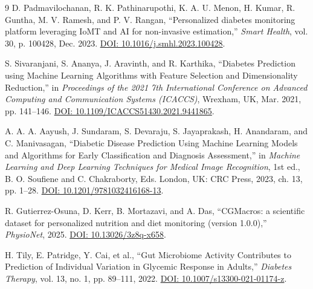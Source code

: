 \documentclass[12pt]{article}
\begin{document}
\begin{thebibliography}{9}
D. Padmavilochanan, R. K. Pathinarupothi, K. A. U. Menon, H. Kumar, R. Guntha, M. V. Ramesh, and P. V. Rangan, 
``Personalized diabetes monitoring platform leveraging IoMT and AI for non-invasive estimation,'' 
\emph{Smart Health}, vol. 30, p. 100428, Dec. 2023. 
\href{https://doi.org/10.1016/j.smhl.2023.100428}{DOI: 10.1016/j.smhl.2023.100428}.

S. Sivaranjani, S. Ananya, J. Aravinth, and R. Karthika, 
``Diabetes Prediction using Machine Learning Algorithms with Feature Selection and Dimensionality Reduction,'' 
in \emph{Proceedings of the 2021 7th International Conference on Advanced Computing and Communication Systems (ICACCS)}, Wrexham, UK, Mar. 2021, pp. 141--146. 
\href{https://doi.org/10.1109/ICACCS51430.2021.9441865}{DOI: 10.1109/ICACCS51430.2021.9441865}.

A. A. A. Aayush, J. Sundaram, S. Devaraju, S. Jayaprakash, H. Anandaram, and C. Manivasagan, 
``Diabetic Disease Prediction Using Machine Learning Models and Algorithms for Early Classification and Diagnosis Assessment,'' 
in \emph{Machine Learning and Deep Learning Techniques for Medical Image Recognition}, 1st ed., B. O. Soufiene and C. Chakraborty, Eds. London, UK: CRC Press, 2023, ch. 13, pp. 1--28. 
\href{https://doi.org/10.1201/9781032416168-13}{DOI: 10.1201/9781032416168-13}.

R. Gutierrez-Osuna, D. Kerr, B. Mortazavi, and A. Das, 
``CGMacros: a scientific dataset for personalized nutrition and diet monitoring (version 1.0.0),'' 
\emph{PhysioNet}, 2025. 
\href{https://doi.org/10.13026/3z8q-x658}{DOI: 10.13026/3z8q-x658}.

H. Tily, E. Patridge, Y. Cai, et al., 
``Gut Microbiome Activity Contributes to Prediction of Individual Variation in Glycemic Response in Adults,'' 
\emph{Diabetes Therapy}, vol. 13, no. 1, pp. 89--111, 2022. 
\href{https://doi.org/10.1007/s13300-021-01174-z}{DOI: 10.1007/s13300-021-01174-z}.
\end{thebibliography}
\end{document}
